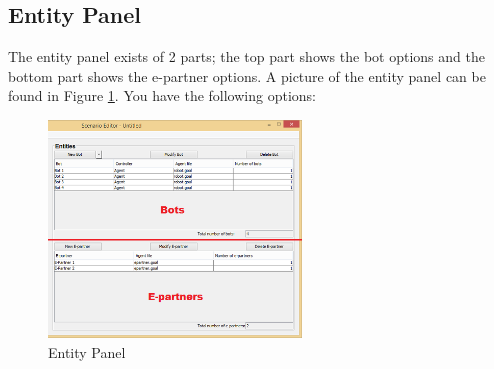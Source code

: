 \subsection{Entity Panel}
The entity panel exists of 2 parts; the top part shows the bot options and the bottom part shows the e-partner options. A picture of the entity panel can be found in Figure \ref{fig:EntityPanel}. You have the following options:


\begin{figure}
\begin{center}
\includegraphics[width=0.6\textwidth]{ScenarioEditor/bot.png}
\end{center}
\caption{Entity Panel}
\label{fig:EntityPanel}
\end{figure}

